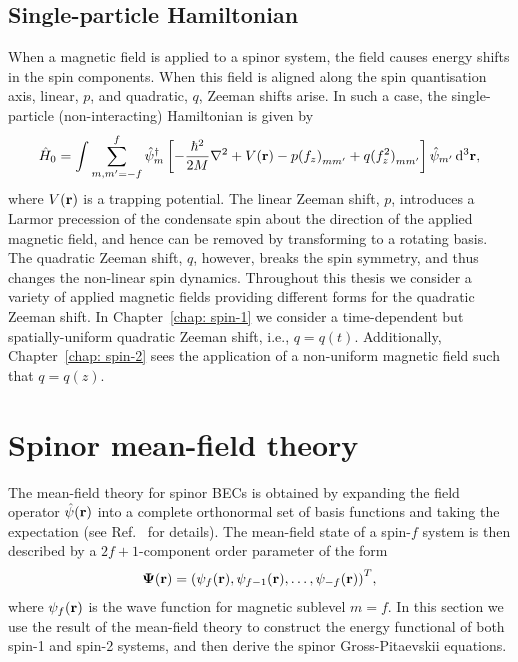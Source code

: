 \subsection{Single-particle Hamiltonian}
When a magnetic field is applied to a spinor system, the field causes energy
shifts in the spin components.
When this field is aligned along the spin quantisation axis, linear, \(p\), and
quadratic, \(q\), Zeeman shifts arise.
In such a case, the single-particle (non-interacting) Hamiltonian is given
by~\cite{Kawaguchi2012}
\begin{equation}\label{eq: single-particle-Hamiltonian}
    \hat{H}_0 = \int \sum_{m,m'=-f}^{f} \hat{\psi}_m^\dagger \left[
        -\frac{\hbar^2}{2M}\nabla^2 + V(\vb{r})
        - p{(f_z)}_{mm'} + q{(f_z^2)}_{mm'}\right]\hat{\psi}_{m'} \,\dd^3\vb{r},
\end{equation}
where \(V(\vb{r})\) is a trapping potential.
The linear Zeeman shift, \(p\), introduces a Larmor precession of the condensate
spin about the direction of the applied magnetic field, and hence can be
removed by transforming to a rotating basis.
The quadratic Zeeman shift, \(q\), however, breaks the spin symmetry, and thus
changes the non-linear spin dynamics.
Throughout this thesis we consider a variety of applied magnetic fields
providing different forms for the quadratic Zeeman shift.
In Chapter~\ref{chap: spin-1} we consider a time-dependent but spatially-uniform
quadratic Zeeman shift, i.e., \(q = q(t)\).
Additionally, Chapter~\ref{chap: spin-2} sees the application of a non-uniform
magnetic field such that \(q=q(z)\).

\section{Spinor mean-field theory}
The mean-field theory for spinor BECs is obtained by expanding the field
operator \(\hat{\psi}(\vb{r})\) into a complete orthonormal set of basis
functions and taking the expectation (see Ref.~\cite{Kawaguchi2012} for
details).
The mean-field state of a spin-\(f\) system is then described by a
\(2f+1\)-component order parameter of the form
\begin{align}
    \vb{\Psi}(\vb{r}) = {\left(\psi_f(\vb{r}), \psi_{f-1}(\vb{r}), \ldots,
        \psi_{-f}(\vb{r})\right)}^T,
\end{align}
where \(\psi_f(\vb{r})\) is the wave function for magnetic sublevel \(m=f\).
In this section we use the result of the mean-field theory to construct the
energy functional of both spin-1 and spin-2 systems, and then derive the
spinor Gross-Pitaevskii equations.

